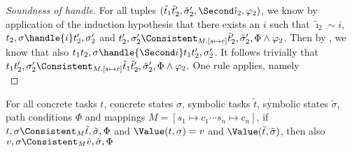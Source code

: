 \begin{proof}[Soundness of handle]
{  For all tuples $(\tilde{t}_1\And\tilde{t}_2',\tilde{\sigma}_2',\Second \tilde{\imath}_2,\phi_2)$,
  we know by application of the induction hypothesis that there exists an $i$ such that
  $\tilde{\imath}_2\sim i$, $t_2,\sigma\handle{i}t_2',\sigma_2'$ and
  $t_2',\sigma_2'\Consistent_{M.[s\mapsto c]}\tilde{t}_2',\tilde{\sigma}_2',\Phi\land\phi_2$.
  Then by , we know that also $t_1\And t_2,\sigma\handle{\Second i}t_1\And t_2',\sigma_2'$.
  It follows trivially that $t_1\And t_2',\sigma_2'\Consistent_{M.[s\mapsto c]}\tilde{t}_1\And \tilde{t}_2',\tilde{\sigma}_2',\Phi\land\phi_2$.
}
%
{One rule applies, namely \\
%
%
%
%
%
%
}

\end{proof}


\begin{lemma}
  \label{lem:valpres}
  For all concrete tasks $t$, concrete states $\sigma$, symbolic tasks $\tilde{t}$, symbolic states $\tilde{\sigma}$, path conditions $\Phi$ and mappings $M=[s_1\mapsto c_1\cdots s_n\mapsto c_n]$,
  if $t,\sigma\Consistent_M\tilde{t},\tilde{\sigma},\Phi$ and $\Value(t,\sigma)=v$ and $\Value(\tilde{t},\tilde{\sigma})$,
  then also $v,\sigma\Consistent_M\tilde{v},\tilde{\sigma},\Phi$
\end{lemma}

